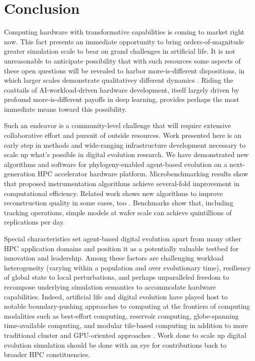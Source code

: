 \section{Conclusion} \label{sec:conclusion}

Computing hardware with transformative capabilities is coming to market right now.
This fact presents an immediate opportunity to bring orders-of-magnitude greater simulation scale to bear on grand challenges in artificial life.
It is not unreasonable to anticipate possibility that with such resources some aspects of these open questions will be revealed to harbor more-is-different dispositions, in which larger scales demonstrate qualitativey different dynamics \citep{anderson1972more}.
Riding the coattails of AI-workload-driven hardware development, itself largely driven by profound more-is-different payoffs in deep learning, provides perhaps the most immediate means toward this possibility.

Such an endeavor is a community-level challenge that will require extensive collaborative effort and pursuit of outside resources.
Work presented here is an early step in methods and wide-ranging infrastructure development necessary to scale up what's possible in digital evolution research.
We have demonstrated new algorithms and software for phylogeny-enabled agent-based evolution on a next-generation HPC accelerator hardware platform.
Microbenchmarking results show that proposed instrumentation algorithms achieve several-fold improvement in computational efficiency.
Related work shows new algorithms to improve reconstruction quality in some cases, too \citep{moreno2024guide}.
Benchmarks show that, including tracking operations, simple models at wafer scale can achieve quintillions of replications per day.

Special characteristics set agent-based digital evolution apart from many other HPC application domains and position it as a potentially valuable testbed for innovation and leadership.
Among these factors are challenging workload heterogeneity (varying within a population and over evolutionary time), resiliency of global state to local perturbations, and perhaps unparalleled freedom to recompose underlying simulation semantics to accommodate hardware capabilities.
Indeed, artificial life and digital evolution have played host to notable boundary-pushing approaches to computing at the frontiers of computing modalities such as best-effort computing, reservoir computing, globe-spanning time-available computing, and modular tile-based computing in addition to more traditional cluster and GPU-oriented approaches \citep{moreno2021conduit,ackley2020best,ackley2023robust,heinemann2008artificial,miikkulainen2024evolving}.
Work done to scale up digital evolution simulation should be done with an eye for contributions back to broader HPC constituencies.

